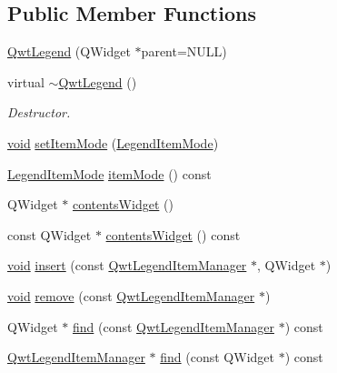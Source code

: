\subsection*{Public Member Functions}
\begin{DoxyCompactItemize}
\item 
\hyperlink{class_qwt_legend_adf5a64070a546eaac36fc9afac56b7fb}{Qwt\-Legend} (Q\-Widget $\ast$parent=N\-U\-L\-L)
\item 
virtual \hyperlink{class_qwt_legend_a2dd3bc628652909b74e7ddb5db021ea5}{$\sim$\-Qwt\-Legend} ()
\begin{DoxyCompactList}\small\item\em Destructor. \end{DoxyCompactList}\item 
\hyperlink{group___u_a_v_objects_plugin_ga444cf2ff3f0ecbe028adce838d373f5c}{void} \hyperlink{class_qwt_legend_aedd86919e56a407bcdd2ae867a672dd1}{set\-Item\-Mode} (\hyperlink{class_qwt_legend_ab216dd2dba9ebf6cb0ed2dd621a652e0}{Legend\-Item\-Mode})
\item 
\hyperlink{class_qwt_legend_ab216dd2dba9ebf6cb0ed2dd621a652e0}{Legend\-Item\-Mode} \hyperlink{class_qwt_legend_a463c5542c6547c04050c912a5e500155}{item\-Mode} () const 
\item 
Q\-Widget $\ast$ \hyperlink{class_qwt_legend_aa52edeceb553ae703516c984f34d7ab7}{contents\-Widget} ()
\item 
const Q\-Widget $\ast$ \hyperlink{class_qwt_legend_acd680c0f17f4184e10a3d3136b9836f5}{contents\-Widget} () const 
\item 
\hyperlink{group___u_a_v_objects_plugin_ga444cf2ff3f0ecbe028adce838d373f5c}{void} \hyperlink{class_qwt_legend_af736d6053c6e891ad4579aa83b1a705d}{insert} (const \hyperlink{class_qwt_legend_item_manager}{Qwt\-Legend\-Item\-Manager} $\ast$, Q\-Widget $\ast$)
\item 
\hyperlink{group___u_a_v_objects_plugin_ga444cf2ff3f0ecbe028adce838d373f5c}{void} \hyperlink{class_qwt_legend_a562535312e3d65616bc63d35a2ec5b7b}{remove} (const \hyperlink{class_qwt_legend_item_manager}{Qwt\-Legend\-Item\-Manager} $\ast$)
\item 
Q\-Widget $\ast$ \hyperlink{class_qwt_legend_a298233007938249f98e728256a2e6a59}{find} (const \hyperlink{class_qwt_legend_item_manager}{Qwt\-Legend\-Item\-Manager} $\ast$) const 
\item 
\hyperlink{class_qwt_legend_item_manager}{Qwt\-Legend\-Item\-Manager} $\ast$ \hyperlink{class_qwt_legend_abb1273941e19ac7d0a3e2f398228ed65}{find} (const Q\-Widget $\ast$) const 

\end{DoxyCompactItemize}
